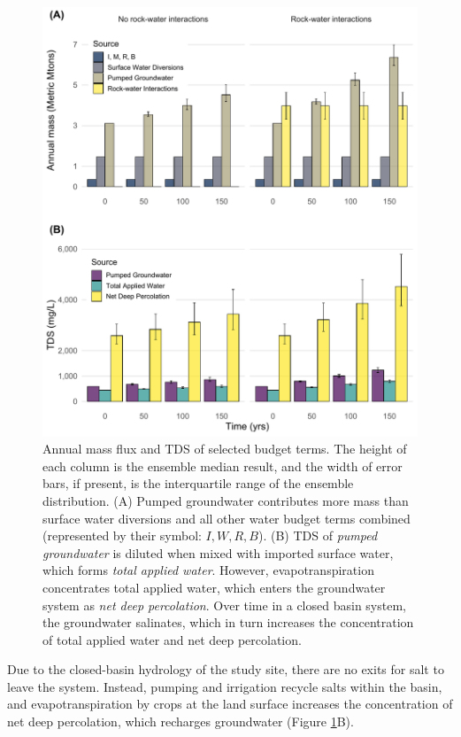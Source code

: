 \begin{figure}[H]
	\centering
	\includegraphics[width=12cm,keepaspectratio]{ch3_figs/p23.pdf}
	\caption{Annual mass flux and TDS of selected budget terms. The height of each column is the ensemble median result, and the width of error bars, if present, is the interquartile range of the ensemble distribution. (A) Pumped groundwater contributes more mass than surface water diversions and all other water budget terms combined (represented by their symbol: $I, W, R, B$). (B) TDS of \textit{pumped groundwater} is diluted when mixed with imported surface water, which forms \textit{total applied water}. However, evapotranspiration concentrates total applied water, which enters the groundwater system as \textit{net deep percolation}. Over time in a closed basin system, the groundwater salinates, which in turn increases the concentration of total applied water and net deep percolation. }
	\label{fig:salt_ec}
\end{figure}



Due to the closed-basin hydrology of the study site, there are no exits for salt to leave the system. Instead, pumping and irrigation recycle salts within the basin, and evapotranspiration by crops at the land surface increases the concentration of net deep percolation, which recharges groundwater (Figure \ref{fig:salt_ec}B). 

